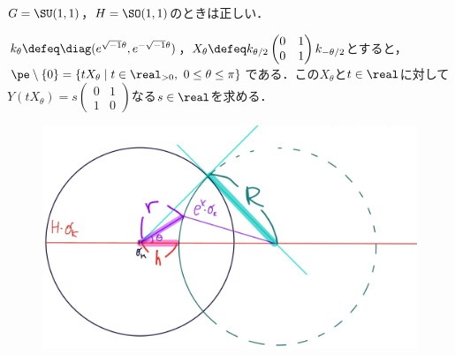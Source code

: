 \begin{prop}\label{prop:yosou-eg}
  $G = \SU(1,1) $，$H = \SO(1,1) $のときは正しい．
\end{prop}




\begin{pfwn}{}

  $k_{\theta} \defeq \diag(e^{\sqrt{-1}\theta},e^{-\sqrt{-1}\theta}) $，$X_{\theta} \defeq k_{\theta/2}
  \begin{pmatrix}
    0 & 1 \\ 0 & 1
  \end{pmatrix}
  k_{-\theta/2}$とすると，$\pe\setminus\{0\} =  \{tX_{\theta}\mid t\in \real_{>0},\ 0\leq \theta\leq \pi\}$である．この$X_{\theta} $と$t\in \real$に対して$Y(tX_{\theta} ) = s
  \begin{pmatrix}
    0 & 1 \\ 1 & 0
  \end{pmatrix}
  $なる$s\in \real $を求める．


   
  \begin{figure}[H]
    \centering
    \includegraphics[scale=0.08]{../graph/yosou-eg-1.jpg}
    \caption{}
    \label{fig:yosou-eg-1}
  \end{figure}


\end{pfwn}

